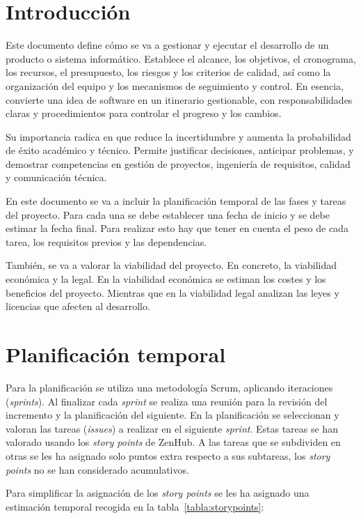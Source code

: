 
\section{Introducción}
Este documento define cómo se va a gestionar y ejecutar el desarrollo de un producto o sistema informático. Establece el alcance, los objetivos, el cronograma, los recursos, el presupuesto, los riesgos y los criterios de calidad, así como la organización del equipo y los mecanismos de seguimiento y control. En esencia, convierte una idea de software en un itinerario gestionable, con responsabilidades claras y procedimientos para controlar el progreso y los cambios.

Su importancia radica en que reduce la incertidumbre y aumenta la probabilidad de éxito académico y técnico. Permite justificar decisiones, anticipar problemas, y demostrar competencias en gestión de proyectos, ingeniería de requisitos, calidad y comunicación técnica.

En este documento se va a incluir la planificación temporal de las fases y tareas del proyecto. Para cada una se debe establecer una fecha de inicio y se debe estimar la fecha final. Para realizar esto hay que tener en cuenta el peso de cada tarea, los requisitos previos y las dependencias.

También, se va a valorar la viabilidad del proyecto. En concreto, la viabilidad económica y la legal. En la viabilidad económica se estiman los costes y los beneficios del proyecto. Mientras que en la viabilidad legal analizan las leyes y licencias que afecten al desarrollo.  

\section{Planificación temporal}
Para la planificación se utiliza una metodología Scrum, aplicando iteraciones (\textit{sprints}). Al finalizar cada \textit{sprint} se realiza una reunión para la revisión del incremento y la planificación del siguiente. En la planificación se seleccionan y valoran las tareas (\textit{issues}) a realizar en el siguiente \textit{sprint}. Estas tareas se han valorado usando los \textit{story points} de ZenHub. A las tareas que se subdividen en otras se les ha asignado solo puntos extra respecto a sus subtareas, los \textit{story points} no se han considerado acumulativos.

Para simplificar la asignación de los \textit{story points} se les ha asignado una estimación temporal recogida en la tabla~\ref{tabla:storypoints}:

